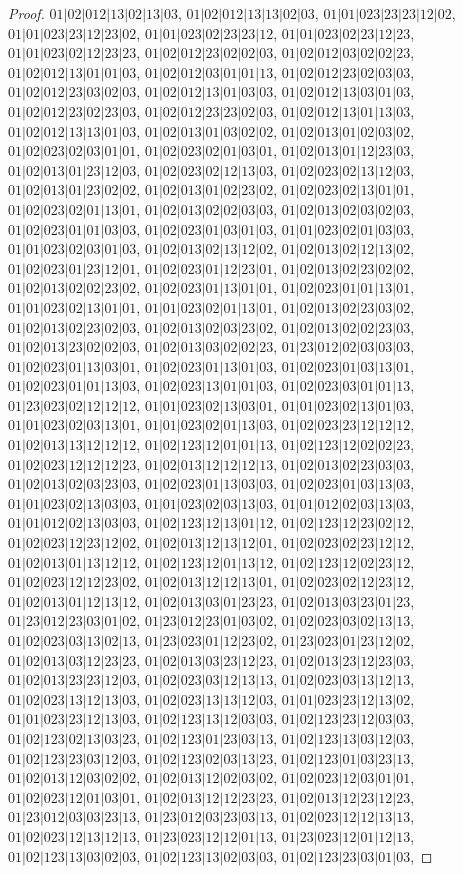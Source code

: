\documentclass[12pt]{article}
\theoremstyle{plain}
\theoremstyle{definition}
\theoremstyle{remark}
\begin{document}
\begin{proof}
$01|02|012|13|02|13|03$, $01|02|012|13|13|02|03$, $01|01|023|23|23|12|02$, $01|01|023|23|12|23|02$, $01|01|023|02|23|23|12$, $01|01|023|02|23|12|23$, $01|01|023|02|12|23|23$, $01|02|012|23|02|02|03$, $01|02|012|03|02|02|23$, $01|02|012|13|01|01|03$, $01|02|012|03|01|01|13$, $01|02|012|23|02|03|03$, $01|02|012|23|03|02|03$, $01|02|012|13|01|03|03$, $01|02|012|13|03|01|03$, $01|02|012|23|02|23|03$, $01|02|012|23|23|02|03$, $01|02|012|13|01|13|03$, $01|02|012|13|13|01|03$, $01|02|013|01|03|02|02$, $01|02|013|01|02|03|02$, $01|02|023|02|03|01|01$, $01|02|023|02|01|03|01$, $01|02|013|01|12|23|03$, $01|02|013|01|23|12|03$, $01|02|023|02|12|13|03$, $01|02|023|02|13|12|03$, $01|02|013|01|23|02|02$, $01|02|013|01|02|23|02$, $01|02|023|02|13|01|01$, $01|02|023|02|01|13|01$, $01|02|013|02|02|03|03$, $01|02|013|02|03|02|03$, $01|02|023|01|01|03|03$, $01|02|023|01|03|01|03$, $01|01|023|02|01|03|03$, $01|01|023|02|03|01|03$, $01|02|013|02|13|12|02$, $01|02|013|02|12|13|02$, $01|02|023|01|23|12|01$, $01|02|023|01|12|23|01$, $01|02|013|02|23|02|02$, $01|02|013|02|02|23|02$, $01|02|023|01|13|01|01$, $01|02|023|01|01|13|01$, $01|01|023|02|13|01|01$, $01|01|023|02|01|13|01$, $01|02|013|02|23|03|02$, $01|02|013|02|23|02|03$, $01|02|013|02|03|23|02$, $01|02|013|02|02|23|03$, $01|02|013|23|02|02|03$, $01|02|013|03|02|02|23$, $01|23|012|02|03|03|03$, $01|02|023|01|13|03|01$, $01|02|023|01|13|01|03$, $01|02|023|01|03|13|01$, $01|02|023|01|01|13|03$, $01|02|023|13|01|01|03$, $01|02|023|03|01|01|13$, $01|23|023|02|12|12|12$, $01|01|023|02|13|03|01$, $01|01|023|02|13|01|03$, $01|01|023|02|03|13|01$, $01|01|023|02|01|13|03$, $01|02|023|23|12|12|12$, $01|02|013|13|12|12|12$, $01|02|123|12|01|01|13$, $01|02|123|12|02|02|23$, $01|02|023|12|12|12|23$, $01|02|013|12|12|12|13$, $01|02|013|02|23|03|03$, $01|02|013|02|03|23|03$, $01|02|023|01|13|03|03$, $01|02|023|01|03|13|03$, $01|01|023|02|13|03|03$, $01|01|023|02|03|13|03$, $01|01|012|02|03|13|03$, $01|01|012|02|13|03|03$, $01|02|123|12|13|01|12$, $01|02|123|12|23|02|12$, $01|02|023|12|23|12|02$, $01|02|013|12|13|12|01$, $01|02|023|02|23|12|12$, $01|02|013|01|13|12|12$, $01|02|123|12|01|13|12$, $01|02|123|12|02|23|12$, $01|02|023|12|12|23|02$, $01|02|013|12|12|13|01$, $01|02|023|02|12|23|12$, $01|02|013|01|12|13|12$, $01|02|013|03|01|23|23$, $01|02|013|03|23|01|23$, $01|23|012|23|03|01|02$, $01|23|012|23|01|03|02$, $01|02|023|03|02|13|13$, $01|02|023|03|13|02|13$, $01|23|023|01|12|23|02$, $01|23|023|01|23|12|02$, $01|02|013|03|12|23|23$, $01|02|013|03|23|12|23$, $01|02|013|23|12|23|03$, $01|02|013|23|23|12|03$, $01|02|023|03|12|13|13$, $01|02|023|03|13|12|13$, $01|02|023|13|12|13|03$, $01|02|023|13|13|12|03$, $01|01|023|23|12|13|02$, $01|01|023|23|12|13|03$, $01|02|123|13|12|03|03$, $01|02|123|23|12|03|03$, $01|02|123|02|13|03|23$, $01|02|123|01|23|03|13$, $01|02|123|13|03|12|03$, $01|02|123|23|03|12|03$, $01|02|123|02|03|13|23$, $01|02|123|01|03|23|13$, $01|02|013|12|03|02|02$, $01|02|013|12|02|03|02$, $01|02|023|12|03|01|01$, $01|02|023|12|01|03|01$, $01|02|013|12|12|23|23$, $01|02|013|12|23|12|23$, $01|23|012|03|03|23|13$, $01|23|012|03|23|03|13$, $01|02|023|12|12|13|13$, $01|02|023|12|13|12|13$, $01|23|023|12|12|01|13$, $01|23|023|12|01|12|13$, $01|02|123|13|03|02|03$, $01|02|123|13|02|03|03$, $01|02|123|23|03|01|03$, 
\end{proof}
\end{document}
